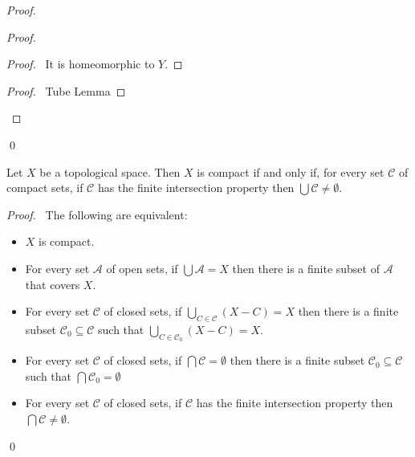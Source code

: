 \begin{proof}
\pf
{}
\begin{proof}
	\begin{proof}
		\pf\ It is homeomorphic to $Y$.
	\end{proof}
	\begin{proof}
		\pf\ Tube Lemma
	\end{proof}
\end{proof}
\qed
\end{proof}

\begin{thm}
Let $X$ be a topological space. Then $X$ is compact if and only if, for every set $\mathcal{C}$ of compact sets, if $\mathcal{C}$ has the finite intersection property then $\bigcup \mathcal{C} \neq \emptyset$.
\end{thm}

\begin{proof}
\pf\ 
The following are equivalent:
\begin{itemize}
\item $X$ is compact.
\item For every set $\mathcal{A}$ of open sets, if $\bigcup \mathcal{A} = X$ then there is a finite subset of $\mathcal{A}$ that covers $X$.
\item For every set $\mathcal{C}$ of closed sets, if $\bigcup_{C \in \mathcal{C}} (X - C) = X$ then there is a finite subset $\mathcal{C}_0 \subseteq \mathcal{C}$ such that $\bigcup_{C \in \mathcal{C}_0} (X - C) = X$.
\item For every set $\mathcal{C}$ of closed sets, if $\bigcap \mathcal{C} = \emptyset$ then there is a finite subset $\mathcal{C}_0 \subseteq \mathcal{C}$ such that $\bigcap \mathcal{C}_0 = \emptyset$
\item For every set $\mathcal{C}$ of closed sets, if $\mathcal{C}$ has the finite intersection property then $\bigcap \mathcal{C} \neq \emptyset$.
\end{itemize}
\qed
\end{proof}


